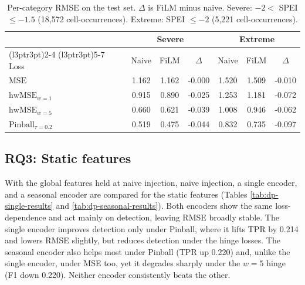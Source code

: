 \documentclass[
]{krantz}
\begin{document}
\begin{table}[!h]
\centering
\caption{\label{tab:dp-film-stratified-main}Per-category RMSE on the test set. $\Delta$ is FiLM minus naive. Severe: $-2 <$ SPEI $\le -1.5$ (18,572 cell-occurrences). Extreme: SPEI $\le -2$ (5,221 cell-occurrences).}
\centering
\fontsize{9}{11}\selectfont
\begin{tabular}[t]{lcccccc}
\toprule
\multicolumn{1}{c}{ } & \multicolumn{3}{c}{Severe} & \multicolumn{3}{c}{Extreme} \\
\cmidrule(l{3pt}r{3pt}){2-4} \cmidrule(l{3pt}r{3pt}){5-7}
Loss & Naive & FiLM & $\Delta$ & Naive & FiLM & $\Delta$\\
\midrule
\textcolor[HTML]{3C3C3C}{\textbf{$\mathrm{MSE}$}} & 1.162 & 1.162 & \textcolor[HTML]{777777}{-0.000} & 1.520 & 1.509 & \textcolor[HTML]{005028}{-0.010}\\
\textcolor[HTML]{6EA5C8}{\textbf{$\mathrm{hwMSE}_{w=1}$}} & 0.915 & 0.890 & \textcolor[HTML]{005028}{-0.025} & 1.253 & 1.181 & \textcolor[HTML]{005028}{-0.072}\\
\textcolor[HTML]{286EA0}{\textbf{$\mathrm{hwMSE}_{w=5}$}} & 0.660 & 0.621 & \textcolor[HTML]{005028}{-0.039} & 1.008 & 0.946 & \textcolor[HTML]{005028}{-0.062}\\
\textcolor[HTML]{C6402A}{\textbf{$\mathrm{Pinball}_{\tau=0.2}$}} & 0.519 & 0.475 & \textcolor[HTML]{005028}{-0.044} & 0.832 & 0.735 & \textcolor[HTML]{005028}{-0.097}\\
\bottomrule
\end{tabular}
\end{table}

\subsection{RQ3: Static features}\label{rq3-static-features}

With the global features held at naive injection, naive injection, a single encoder, and a seasonal encoder are compared for the static features (Tables \ref{tab:dp-single-results} and \ref{tab:dp-seasonal-results}).
Both encoders show the same loss-dependence and act mainly on detection, leaving RMSE broadly stable.
The single encoder improves detection only under Pinball, where it lifts TPR by 0.214 and lowers RMSE slightly, but reduces detection under the hinge losses.
The seasonal encoder also helps most under Pinball (TPR up 0.220) and, unlike the single encoder, under MSE too, yet it degrades sharply under the \(w=5\) hinge (F1 down 0.220).
Neither encoder consistently beats the other.
\end{document}
